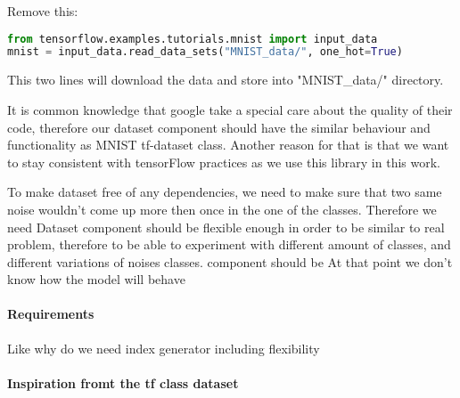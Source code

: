 Remove this:
\begin{lstlisting}[language=Python]
from tensorflow.examples.tutorials.mnist import input_data
mnist = input_data.read_data_sets("MNIST_data/", one_hot=True)
\end{lstlisting}
This two lines will download the data and store into "MNIST_data/" directory.

It is common knowledge that google take a special care about the quality of their code,
therefore our dataset component should have the similar
behaviour and functionality as MNIST tf-dataset class. Another reason for that
is that we want to stay consistent with tensorFlow practices as we use this library
in this work.



To make dataset free of any dependencies, we need to make sure that two
same noise wouldn't come up more then once in the one of the classes.
Therefore we need 
Dataset component should be flexible enough in order to be similar to real problem,
therefore to be able to experiment with different amount of classes, and
different variations of noises classes. component should be
 At that point we don't know how the model will behave



\paragraph{Requirements} Like why do we need index generator
including flexibility
\paragraph{Inspiration fromt the tf class dataset}

